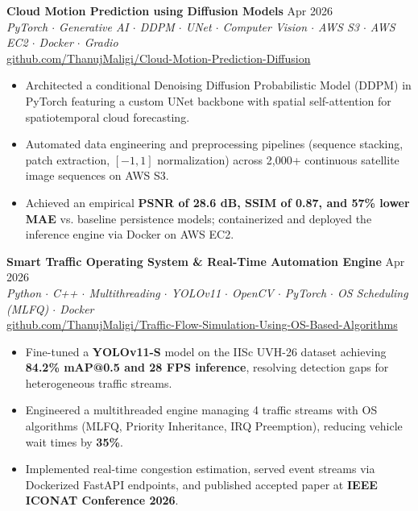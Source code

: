 \documentclass[a4paper,10pt]{article}
\begin{document}
\vspace{2pt}

\textbf{Cloud Motion Prediction using Diffusion Models} \hfill Apr 2026\\
\textit{PyTorch $\cdot$ Generative AI $\cdot$ DDPM $\cdot$ UNet $\cdot$ Computer Vision $\cdot$ AWS S3 $\cdot$ AWS EC2 $\cdot$ Docker $\cdot$ Gradio}\\
\href{https://github.com/ThanujMaligi/Cloud-Motion-Prediction-Diffusion}{github.com/ThanujMaligi/Cloud-Motion-Prediction-Diffusion}
\begin{itemize}[leftmargin=*,noitemsep,topsep=1pt,parsep=0pt,partopsep=0pt,itemsep=1pt]
\item Architected a conditional Denoising Diffusion Probabilistic Model (DDPM) in PyTorch featuring a custom UNet backbone with spatial self-attention for spatiotemporal cloud forecasting.
\item Automated data engineering and preprocessing pipelines (sequence stacking, patch extraction, $[-1, 1]$ normalization) across 2,000+ continuous satellite image sequences on AWS S3.
\item Achieved an empirical \textbf{PSNR of 28.6 dB, SSIM of 0.87, and 57\% lower MAE} vs. baseline persistence models; containerized and deployed the inference engine via Docker on AWS EC2.
\end{itemize}

\vspace{2pt}

\textbf{Smart Traffic Operating System \& Real-Time Automation Engine} \hfill Apr 2026\\
\textit{Python $\cdot$ C++ $\cdot$ Multithreading $\cdot$ YOLOv11 $\cdot$ OpenCV $\cdot$ PyTorch $\cdot$ OS Scheduling (MLFQ) $\cdot$ Docker}\\
\href{https://github.com/ThanujMaligi/Traffic-Flow-Simulation-Using-OS-Based-Algorithms-}{github.com/ThanujMaligi/Traffic-Flow-Simulation-Using-OS-Based-Algorithms}
\begin{itemize}[leftmargin=*,noitemsep,topsep=1pt,parsep=0pt,partopsep=0pt,itemsep=1pt]
\item Fine-tuned a \textbf{YOLOv11-S} model on the IISc UVH-26 dataset achieving \textbf{84.2\% mAP@0.5 and 28 FPS inference}, resolving detection gaps for heterogeneous traffic streams.
\item Engineered a multithreaded engine managing 4 traffic streams with OS algorithms (MLFQ, Priority Inheritance, IRQ Preemption), reducing vehicle wait times by \textbf{35\%}.
\item Implemented real-time congestion estimation, served event streams via Dockerized FastAPI endpoints, and published accepted paper at \textbf{IEEE ICONAT Conference 2026}.
\end{itemize}
\end{document}
